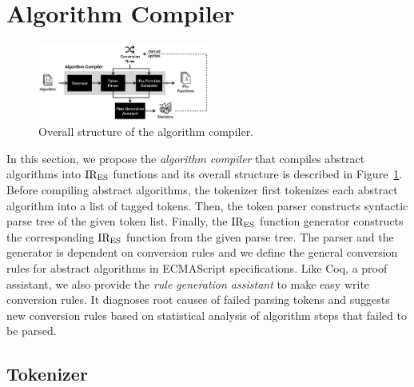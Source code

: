 \section{Algorithm Compiler}\label{sec:compiler}

\begin{figure}
  \centering
  \includegraphics[width=0.5\textwidth]{img/algo_compiler.png}
  \caption{Overall structure of the algorithm compiler.}
  \label{fig:algo-compiler}
\end{figure}

In this section, we propose the \textit{algorithm compiler}
that compiles abstract algorithms into \( \text{IR}_\text{ES} \) functions
and its overall structure is described in Figure~\ref{fig:algo-compiler}.
Before compiling abstract algorithms,
the tokenizer first tokenizes each abstract algorithm into
a list of tagged tokens. Then, the token parser constructs
syntactic parse tree of the given token list.
Finally, the \( \text{IR}_\text{ES} \) function generator constructs the corresponding
\( \text{IR}_\text{ES} \) function from the given parse tree.
The parser and the generator is dependent on conversion rules
and we define the general conversion rules for abstract algorithms in
ECMAScript specifications. Like Coq, a proof assistant, we also provide
the \textit{rule generation assistant} to make easy write conversion rules.
It diagnoses root causes of failed parsing tokens
and suggests new conversion rules based on
statistical analysis of algorithm steps that failed to be parsed.

\subsection{Tokenizer}

